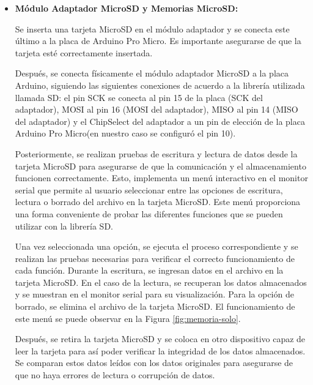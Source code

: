 \begin{itemize}
\item \textbf{Módulo Adaptador MicroSD y Memorias MicroSD:}

Se inserta una tarjeta MicroSD en el módulo adaptador y se conecta este último a la placa de Arduino Pro Micro. Es importante asegurarse de que la tarjeta esté correctamente insertada. 

Después, se conecta físicamente el módulo adaptador MicroSD a la placa Arduino, siguiendo las siguientes conexiones de acuerdo a la librería utilizada llamada SD: el pin SCK se conecta al pin 15 de la placa (SCK del adaptador), MOSI al pin 16 (MOSI del adaptador), MISO al pin 14 (MISO del adaptador) y el ChipSelect del adaptador a un pin de elección de la placa Arduino Pro Micro(en nuestro caso se configuró el pin 10).

Posteriormente, se realizan pruebas de escritura y lectura de datos desde la tarjeta MicroSD para asegurarse de que la comunicación y el almacenamiento funcionen correctamente. Esto, implementa un menú interactivo en el monitor serial que permite al usuario seleccionar entre las opciones de escritura, lectura o borrado del archivo en la tarjeta MicroSD. Este menú proporciona una forma conveniente de probar las diferentes funciones que se pueden utilizar con la librería SD.

Una vez seleccionada una opción, se ejecuta el proceso correspondiente y se realizan las pruebas necesarias para verificar el correcto funcionamiento de cada función. Durante la escritura, se ingresan datos en el archivo en la tarjeta MicroSD. En el caso de la lectura, se recuperan los datos almacenados y se muestran en el monitor serial para su visualización. Para la opción de borrado, se elimina el archivo de la tarjeta MicroSD. El funcionamiento de este menú se puede observar en la Figura \ref{fig:memoria-solo}.

Después, se retira la tarjeta MicroSD y se coloca en otro dispositivo capaz de leer la tarjeta para así poder verificar la integridad de los datos almacenados. Se comparan estos datos leídos con los datos originales para asegurarse de que no haya errores de lectura o corrupción de datos.


\end{itemize}
